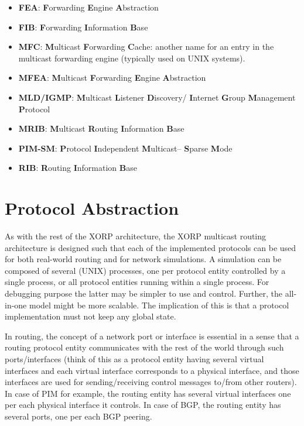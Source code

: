 \documentclass[11pt]{article}
\begin{document}
\begin{itemize}

  \item {\bf FEA}: {\bf F}orwarding {\bf E}ngine {\bf A}bstraction

  \item {\bf FIB}: {\bf F}orwarding {\bf I}nformation {\bf B}ase

  \item {\bf MFC}: {\bf M}ulticast {\bf F}orwarding {\bf C}ache: another
  name for an entry in the multicast forwarding engine (typically used
  on UNIX systems).

  \item {\bf MFEA}: {\bf M}ulticast {\bf F}orwarding {\bf E}ngine
  {\bf A}bstraction

  \item {\bf MLD/IGMP}: {\bf M}ulticast {\bf L}istener {\bf D}iscovery/{\bf
  I}nternet {\bf G}roup {\bf M}anagement {\bf P}rotocol

  \item {\bf MRIB}: {\bf M}ulticast {\bf R}outing {\bf I}nformation
  {\bf B}ase

  \item {\bf PIM-SM}: {\bf P}rotocol {\bf I}ndependent {\bf M}ulticast--{\bf
  S}parse {\bf M}ode

  \item {\bf RIB}: {\bf R}outing {\bf I}nformation {\bf B}ase

\end{itemize}


\section{Protocol Abstraction}

As with the rest of the XORP architecture, the XORP multicast routing
architecture is designed such that each of the implemented protocols
can be used for both real-world routing and for network simulations.  A
simulation can be composed of several (UNIX) processes, one per
protocol entity controlled by a single process, or all protocol entities
running within a single process. For debugging purpose the latter may be
simpler to use and control. Further, the all-in-one model might be more
scalable. The implication of this is that a protocol implementation
must not keep any global state.

In routing, the concept of a network port or interface is essential in a
sense that a routing protocol entity communicates with the rest of the
world through such ports/interfaces (think of this as a protocol entity
having several virtual interfaces and each virtual interface corresponds
to a physical interface, and those interfaces are used for
sending/receiving control messages to/from other routers). In case of
PIM for example, the routing entity has several virtual interfaces one
per each physical interface it controls.  In case of BGP,
the routing entity has several ports, one per each BGP peering.
\end{document}
